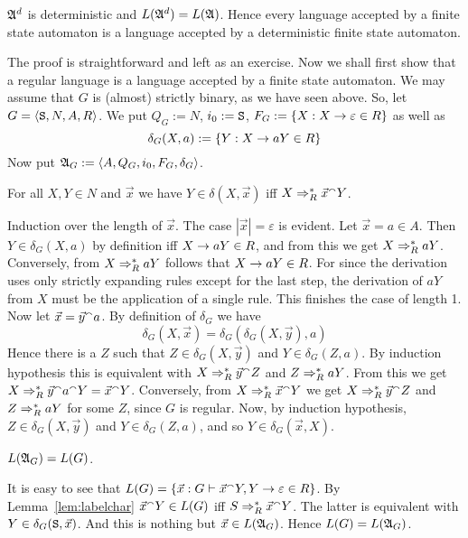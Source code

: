\begin{prop}
$\mathfrak{A}^d$ is deterministic and $L(\mathfrak{A}^d) = L(\mathfrak{A})$.
Hence every language accepted by a finite state automaton is
a language accepted by a deterministic finite state
automaton.
\end{prop}
The proof is straightforward and left as an exercise. Now we
shall first show that a regular language is a language
accepted by a finite state automaton. We may assume that
$G$ is (almost) strictly binary, as we have seen above. So, let
$G = \langle \mbox{\tt S}, N, A, R\rangle$. We put $Q_G := N$, $i_0 := 
\mbox{\tt S}$, $F_G := \{X : X \rightarrow \varepsilon \in R\}$ as well as
\begin{equation}
\delta_G(X,a) :=  \{Y : X \rightarrow a Y \in R\} 
\end{equation}
Now put $\mathfrak{A}_G := \langle A, Q_G, i_0, F_G, \delta_G\rangle$.
\begin{lem}
\label{lem:labelchar}
For all $X, Y \in N$ and $\vec{x}$ we have
$Y \in \delta(X,\vec{x})$ iff $X \Rightarrow^{\ast}_R \vec{x} {^{\smallfrown}} Y$.
\end{lem}
\proofbeg
Induction over the length of $\vec{x}$. The case $|\vec{x}| =
\varepsilon$ is evident. Let $\vec{x} = a \in A$.
Then $Y \in \delta_G(X,a)$ by definition iff
$X \rightarrow a Y \in R$, and from this we get $X \Rightarrow_R^{\ast} a Y$.
Conversely, from $X \Rightarrow^{\ast}_R a Y$ follows that $X \rightarrow a Y \in
R$. For since the derivation uses only strictly expanding rules 
except for the last step, the derivation of $a Y$ from $X$ must 
be the application of a single rule. This finishes the case of 
length 1. Now let $\vec{x} = \vec{y} {^{\smallfrown}} a$. By definition of 
$\delta_G$ we have
\begin{equation}
\delta_G(X, \vec{x}) = \delta_G(\delta_G(X,\vec{y}),a) 
\end{equation}
Hence there is a $Z$ such that $Z \in \delta_G(X, \vec{y})$ and
$Y \in \delta_G(Z,a)$. By induction hypothesis this is equivalent
with $X \Rightarrow_R^{\ast} \vec{y}{^{\smallfrown}}  Z$ and $Z \Rightarrow^{\ast}_R a Y$. 
From this we get $X \Rightarrow^{\ast}_R \vec{y}{^{\smallfrown}}  a {^{\smallfrown}} Y = \vec{x}{^{\smallfrown}} Y$.
Conversely, from $X \Rightarrow^{\ast}_R \vec{x}{^{\smallfrown}} Y$ we get 
$X \Rightarrow^{\ast}_R \vec{y} {^{\smallfrown}} Z$ and $Z \Rightarrow^{\ast}_R a Y$ for some $Z$,
since $G$ is regular. Now, by induction hypothesis,
$Z \in \delta_G(X, \vec{y})$ and $Y \in \delta_G(Z,a)$, and
so $Y \in \delta_G(\vec{x},X)$.
\proofend
\begin{prop}
$L(\mathfrak{A}_G) = L(G)$.
\end{prop}
\proofbeg
It is easy to see that
$L(G) = \{\vec{x} : G \vdash \vec{x}{^{\smallfrown}} Y, Y \rightarrow \varepsilon \in R\}$.
By Lemma~\ref{lem:labelchar} $\vec{x} {^{\smallfrown}} Y \in L(G)$ iff
$S \Rightarrow^{\ast}_R \vec{x} {^{\smallfrown}} Y$. The latter is equivalent with
$Y \in \delta_G(\mbox{\tt S}, \vec{x})$. And this is nothing but
$\vec{x} \in L(\mathfrak{A}_G)$. Hence $L(G) = L(\mathfrak{A}_G)$.
\proofend

